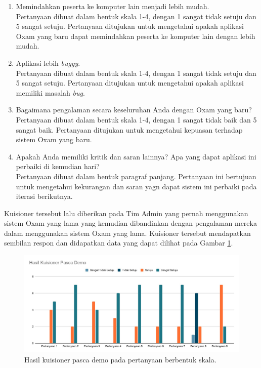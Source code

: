 \begin{enumerate}
        \item Memindahkan peserta ke komputer lain menjadi lebih mudah. \\
            Pertanyaan dibuat dalam bentuk skala 1-4, dengan 1 sangat tidak setuju dan 5 sangat setuju.
            Pertanyaan ditujukan untuk mengetahui apakah aplikasi Oxam yang baru dapat memindahkan
            peserta ke komputer lain dengan lebih mudah.
        
        
        \item Aplikasi lebih \textit{buggy}. \\
            Pertanyaan dibuat dalam bentuk skala 1-4, dengan 1 sangat tidak setuju dan 5 sangat setuju.
            Pertanyaan ditujukan untuk mengetahui apakah aplikasi memiliki masalah \textit{bug}.
        
        
        \item Bagaimana pengalaman secara keseluruhan Anda dengan Oxam yang baru? \\
            Pertanyaan dibuat dalam bentuk skala 1-4, dengan 1 sangat tidak baik dan 5 sangat baik.
            Pertanyaan ditujukan untuk mengetahui kepuasan terhadap sistem Oxam yang baru.
        
        
        \item Apakah Anda memiliki kritik dan saran lainnya? Apa yang dapat aplikasi ini perbaiki di kemudian hari? \\
            Pertanyaan dibuat dalam bentuk paragraf panjang. Pertanyaan ini bertujuan untuk mengetahui
            kekurangan dan saran yagn dapat sistem ini perbaiki pada iterasi berikutnya.
    \end{enumerate}
    
    Kuisioner tersebut lalu diberikan pada Tim Admin yang pernah menggunakan sistem Oxam yang lama yang kemudian
    dibandinkan dengan pengalaman mereka dalam menggunakan sistem Oxam yang lama. Kuisioner tersebut mendapatkan
    sembilan respon dan didapatkan data yang dapat dilihat pada Gambar \ref{fig:kuisioner_demo}.
    \begin{figure}
        \centering
        \includegraphics[width=0.75\paperwidth]{Gambar/Hasil Kuisioner.pdf}
        \caption{Hasil kuisioner pasca demo pada pertanyaan berbentuk skala.}
        \label{fig:kuisioner_demo}
    \end{figure}
    
